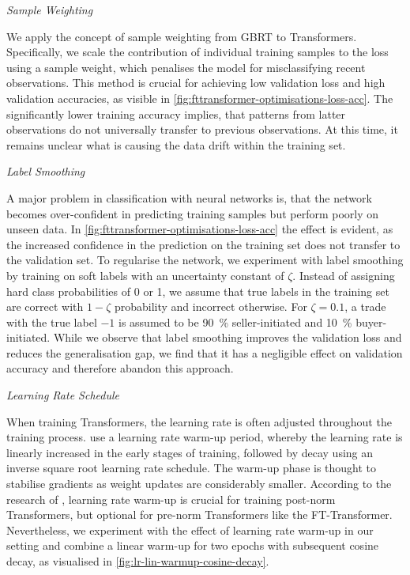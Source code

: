 \emph{Sample Weighting}

We apply the concept of sample weighting from \gls{GBRT} to Transformers. Specifically, we scale the contribution of individual training samples to the loss using a sample weight, which penalises the model for misclassifying recent observations. This method is crucial for achieving low validation loss and high validation accuracies, as visible in \cref{fig:fttransformer-optimisations-loss-acc}. The significantly lower training accuracy implies, that patterns from latter observations do not universally transfer to previous observations. At this time, it remains unclear what is causing the data drift within the training set.

\emph{Label Smoothing}

A major problem in classification with neural networks is, that the network becomes over-confident in predicting training samples but perform poorly on unseen data. In \cref{fig:fttransformer-optimisations-loss-acc} the effect is evident, as the increased confidence in the prediction on the training set does not transfer to the validation set. To regularise the network, we experiment with label smoothing \autocite[][2823]{szegedyRethinkingInceptionArchitecture2016} by training on soft labels with an uncertainty constant of $\zeta$. Instead of assigning hard class probabilities of 0 or 1, we assume that true labels in the training set are correct with $1-\zeta$ probability and incorrect otherwise. For $\zeta=\num{0.1}$, a trade with the true label $-1$ is assumed to be \SI{90}{\percent} seller-initiated and \SI{10}{\percent} buyer-initiated. While we observe that label smoothing improves the validation loss and reduces the generalisation gap, we find that it has a negligible effect on validation accuracy and therefore abandon this approach.

\emph{Learning Rate Schedule}

When training Transformers, the learning rate is often adjusted throughout the training process. \textcite[][7]{vaswaniAttentionAllYou2017} use a learning rate warm-up period, whereby the learning rate is linearly increased in the early stages of training, followed by decay using an inverse square root learning rate schedule. The warm-up phase is thought to stabilise gradients as weight updates are considerably smaller. According to the research of \textcite[][3--4]{xiongLayerNormalizationTransformer2020}, learning rate warm-up is crucial for training post-norm Transformers, but optional for pre-norm Transformers like the FT-Transformer. Nevertheless, we experiment with the effect of learning rate warm-up in our setting and combine a linear warm-up for two epochs with subsequent cosine decay, as visualised in \cref{fig:lr-lin-warmup-cosine-decay}.

